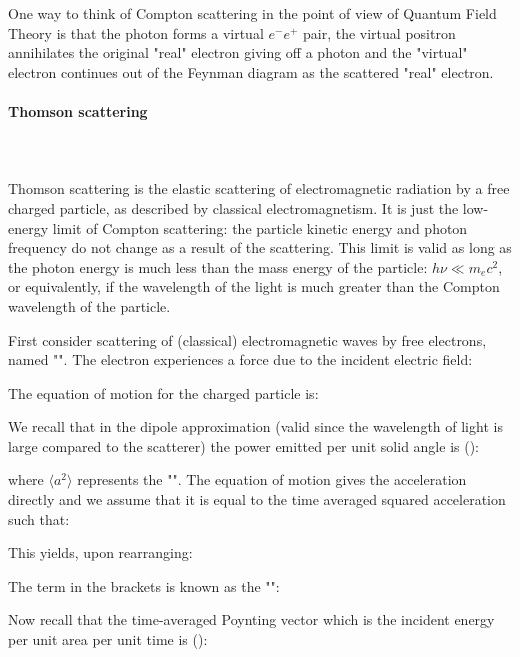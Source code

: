 	\begin{tcolorbox}[title=Remark,colframe=black,arc=10pt]
	One way to think of Compton scattering in the point of view of Quantum Field Theory is that the photon forms a virtual $e^-e^+$ pair, the virtual positron annihilates the original "real" electron giving off a photon and the "virtual" electron continues out of the Feynman diagram as the scattered "real" electron.
	\end{tcolorbox}
	
	\paragraph{Thomson scattering}\label{Thomson scattering}\mbox{}\\\\
	Thomson scattering is the elastic scattering of electromagnetic radiation by a free charged particle, as described by classical electromagnetism. It is just the low-energy limit of Compton scattering: the particle kinetic energy and photon frequency do not change as a result of the scattering. This limit is valid as long as the photon energy is much less than the mass energy of the particle: $h\nu \ll m_ec^{2}$, or equivalently, if the wavelength of the light is much greater than the Compton wavelength of the particle.
	
	First consider scattering of (classical) electromagnetic waves by free electrons, named "". The electron experiences a force due to the incident electric field:
	
	The equation of motion for the charged particle is:
	
	We recall that in the dipole approximation (valid since the wavelength of light is large compared to the scatterer) the power emitted per unit solid angle\label{solid angle atomic physics} is ():
	
	where $\langle a^2 \rangle$ represents the "". The equation of motion gives the acceleration directly and we assume that it is equal to the time averaged squared acceleration such that:
	
	This yields, upon rearranging:
	
	The term in the brackets is known as the "":
	
	Now recall that the time-averaged Poynting vector which is the incident energy per unit area per unit time is ():
	
